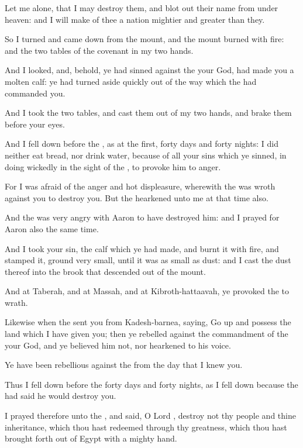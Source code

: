 {Let me
alone, that I may
destroy them, and blot
out their
name from under
heaven: and I will
make
of thee a
nation
mightier and
greater than they.

So I
turned and came
down from the
mount, and the
mount
burned with
fire: and the
two
tables of the
covenant
{} in my
two
hands.

And I
looked, and, behold, ye had
sinned against the
{} your
God,
{} had
made you a
molten
calf: ye had turned
aside
quickly out of the
way which the
{} had
commanded you.

And I
took the
two
tables, and
cast them out
of my
two
hands, and
brake them before your
eyes.

And I fell
down
before the
{}, as at the
first,
forty
days and
forty
nights: I did neither
eat
bread, nor
drink
water, because of all your
sins which ye
sinned, in
doing
wickedly in the
sight of the
{}, to provoke him to
anger.

For I was
afraid
of the
anger and hot
displeasure, wherewith the
{} was
wroth against you to
destroy you. But the
{}
hearkened unto me at that
time also.

And the
{} was
very
angry with
Aaron to have
destroyed him: and I
prayed for
Aaron also the same
time.

And I
took your
sin, the
calf which ye had
made, and
burnt it with
fire, and
stamped it,
{}
ground
{} very
small,
{} until it was as
small as
dust: and I
cast the
dust thereof into the
brook that descended
out of the
mount.

And at
Taberah, and at
Massah, and at
Kibroth-hattaavah, ye provoked the
{} to
wrath.

Likewise when the
{}
sent you from
Kadesh-barnea,
saying, Go
up and
possess the
land which I have
given you; then ye
rebelled against the
commandment of the
{} your
God, and ye
believed him not, nor
hearkened to his
voice.

Ye have been
rebellious against the
{} from the
day that I
knew you.

Thus I fell
down
before the
{}
forty
days and
forty
nights, as I fell
down
{} because the
{} had
said he would
destroy you.

I
prayed therefore unto the
{}, and
said, O
Lord
{},
destroy not thy
people and thine
inheritance, which thou hast
redeemed through thy
greatness, which thou hast brought
forth out of
Egypt with a
mighty
hand.

}

